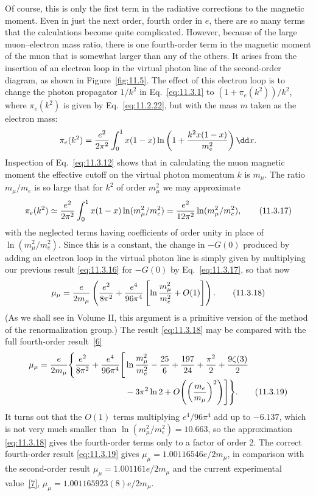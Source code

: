 Of course, this is only the first term in the radiative corrections to the
magnetic moment. Even in just the next order, fourth order in $e$, there are
so many terms that the calculations become quite complicated. However,
because of the large muon--electron mass ratio, there is one fourth-order term
in the magnetic moment of the muon that is somewhat larger than any of the
others. It arises from the insertion of an electron loop in the virtual photon
line of the second-order diagram, as shown in Figure~\ref{fig:11.5}. The effect of this
electron loop is to change the photon propagator $1/k^2$ in Eq.~\eqref{eq:11.3.1} to
$(1+\pi_e(k^2))/k^2$, where $\pi_e(k^2)$ is given by Eq.~\eqref{eq:11.2.22}, but with
the mass $m$ taken as the electron mass:
\[
\pi_e(k^2)={e^2\over2\pi^2}\int_0^1x(1-x)
 \ln\left(1+{k^2x(1-x)\over m_e^2}\right)\dd x.
\]
Inspection of Eq.~\eqref{eq:11.3.12} shows that in calculating the muon magnetic
moment the effective cutoff on the virtual photon momentum $k$ is $m_\mu$.
The ratio $m_\mu/m_e$ is so large that for $k^2$ of order $m_\mu^2$ we may
approximate
\begin{equation}
\pi_e(k^2)\simeq{e^2\over2\pi^2}\int_0^1x(1-x)
 \ln(m_\mu^2/m_e^2)
 ={e^2\over12\pi^2}\ln(m_\mu^2/m_e^2),
\tag{11.3.17}\label{eq:11.3.17}
\end{equation}
with the neglected terms having coefficients of order unity in place of
$\ln(m_\mu^2/m_e^2)$. Since this is a constant, the change in $-G(0)$
produced by adding an electron loop in the virtual photon line is simply
given by multiplying our previous result \eqref{eq:11.3.16} for $-G(0)$ by
Eq.~\eqref{eq:11.3.17}, so that now
\begin{equation}
\mu_\mu={e\over2m_\mu}\left({e^2\over8\pi^2}
 +{e^4\over96\pi^4}\left[\ln{m_\mu^2\over m_e^2}+O(1)\right]\right).
\tag{11.3.18}\label{eq:11.3.18}
\end{equation}
(As we shall see in Volume II, this argument is a primitive version of the
method of the renormalization group.) The result \eqref{eq:11.3.18} may be compared
with the full fourth-order result~\hyperref[ref:11.6]{[6]}
\begin{align}
\mu_\mu={e\over2m_\mu}\Biggl\{{e^2\over8\pi^2}
 +{e^4\over96\pi^4}\Biggl[&\ln{m_\mu^2\over m_e^2}-{25\over6}
 +{197\over24}+{\pi^2\over2}+{9\zeta(3)\over2}
\notag\\[-2pt]
&-3\pi^2\ln2+O\!\left(\left({m_e\over m_\mu}\right)^2\right)\Biggr]
 \Biggr\}.
\tag{11.3.19}\label{eq:11.3.19}
\end{align}
It turns out that the $O(1)$ terms multiplying $e^4/96\pi^4$ add up to
$-6.137$, which is not very much smaller than
$\ln(m_\mu^2/m_e^2)=10.663$, so the approximation \eqref{eq:11.3.18} gives the
fourth-order terms only to a factor of order 2. The correct fourth-order
result \eqref{eq:11.3.19} gives $\mu_\mu=1.00116546e/2m_\mu$, in comparison with the
second-order result $\mu_\mu=1.001161e/2m_\mu$ and the current experimental
value~\hyperref[ref:11.7]{[7]}, $\mu_\mu=1.001165923(8)e/2m_\mu$.

